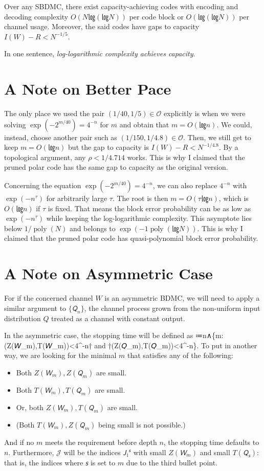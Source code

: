 \documentclass[openany]{amsbook}
\numberwithin{equation}{chapter}
\numberwithin{figure}{chapter}
\numberwithin{table}{chapter}
\DeclareMathOperator\poly{poly}
\def\[#1\]{\begin{equation*}{#1}\end{equation*}}
\theoremstyle{definition}	理dfn:Definition~?s			理exa:Example~?s
\theoremstyle{remark}		理cla:Claim~?s				理rem:Remark~?s
\begin{document}
	\begin{cor}
		Over any SBDMC, there exist capacity-achieving codes with encoding and decoding
		complexity $O(N㏒(㏒N))$ per code block or $O(㏒(㏒N))$ per channel usage.
		Moreover, the said codes have gaps to capacity $I(W)-R<N^{-1/5}$.
	\end{cor}
	
	In one sentence, \emph{log-logarithmic complexity achieves capacity}.

\section{A Note on Better Pace}

	The only place we used the pair $(1/40,1/5)∈𝒪$ explicitly is when
	we were solving $\exp(-2^{m/40})=4^{-n}$ for $m$ and obtain that $m=O(㏒n)$.
	We could, instead, choose another pair such as $(1/150,1/4.8)∈𝒪$.
	Then, we still get to keep $m=O(㏒n)$
	but the gap to capacity is $I(W)-R<N^{-1/4.8}$.
	By a topological argument, any $ρ<1/4.714$ works.
	This is why I claimed that the pruned polar code
	has the same gap to capacity as the original version.
	
	Concerning the equation $\exp(-2^{m/40})=4^{-n}$,
	we can also replace $4^{-n}$ with $\exp(-n^τ)$ for arbitrarily large $τ$.
	The root is then $m=O(τ㏒n)$, which is $O(㏒n)$ if $τ$ is fixed.
	That means the block error probability can be as low as $\exp(-n^τ)$
	while keeping the log-logarithmic complexity.
	This asymptote lies below $1/\poly(N)$ and belongs to $\exp(-1\poly(㏒N))$.
	This is why I claimed that the pruned polar code
	has quasi-polynomial block error probability.

\section{A Note on Asymmetric Case}

	For if the concerned channel $W$ is an asymmetric BDMC, we will need to apply
	a similar argument to $\{𝘘_n\}$, the channel process grown from
	the non-uniform input distribution $Q$ treated as a channel with constant output.
	
	In the asymmetric case, the stopping time will be defined as
	\[𝘴≔n∧\min\{m:\min(Z(𝘞_m),T(𝘞_m))<4^{-n}† and †\min(Z(𝘘_m),T(𝘘_m))<4^{-n}\}.\]
	To put in another way, we are looking for the minimal $m$
	that satisfies any of the following:
	\begin{itemize}
		\item	Both $Z(𝘞_m),Z(𝘘_m)$ are small.
		\item	Both $T(𝘞_m),T(𝘘_m)$ are small.
		\item	Or, both $Z(𝘞_m),T(𝘘_m)$ are small.
		\item	(Both $T(𝘞_m),Z(𝘘_m)$ being small is not possible.)
	\end{itemize}
	And if no $m$ meets the requirement before depth $n$,
	the stopping time defaults to $n$.
	Furthermore, $𝒥$ will be the indices $𝘑₁^𝘴$ with small $Z(𝘞_m)$ and small $T(𝘘_𝘴)$:
	that is, the indices where $𝘴$ is set to $m$ due to the third bullet point.
	
\end{document}
